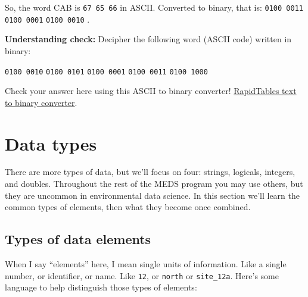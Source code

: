 \documentclass[
]{book}
\begin{document}
So, the word CAB is \texttt{67\ 65\ 66} in ASCII. Converted to binary, that is: \texttt{0100\ 0011} \texttt{0100\ 0001} \texttt{0100\ 0010} .

\textbf{Understanding check:} Decipher the following word (ASCII code) written in binary:

\texttt{0100\ 0010} \texttt{0100\ 0101} \texttt{0100\ 0001} \texttt{0100\ 0011} \texttt{0100\ 1000}

Check your answer here using this ASCII to binary converter! \href{https://www.rapidtables.com/convert/number/ascii-to-binary.html}{RapidTables text to binary converter}.

\hypertarget{data-types}{%
\section{Data types}\label{data-types}}

There are more types of data, but we'll focus on four: strings, logicals, integers, and doubles. Throughout the rest of the MEDS program you may use others, but they are uncommon in environmental data science. In this section we'll learn the common types of elements, then what they become once combined.

\hypertarget{types-of-data-elements}{%
\subsection{Types of data elements}\label{types-of-data-elements}}

When I say ``elements'' here, I mean single units of information. Like a single number, or identifier, or name. Like \texttt{12}, or \texttt{north} or \texttt{site\_12a}. Here's some language to help distinguish those types of elements:
\end{document}
